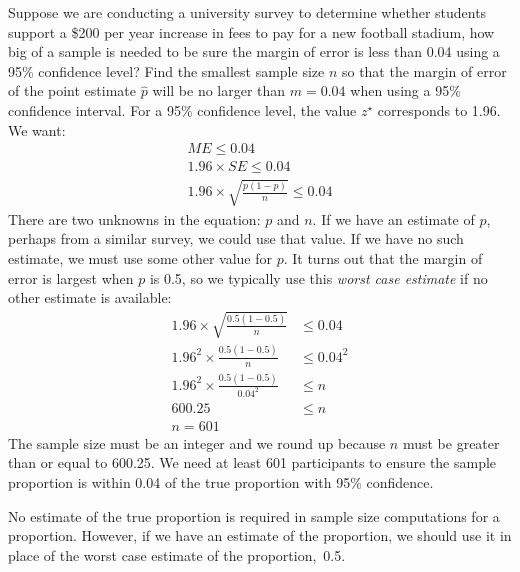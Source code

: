 \begin{example}{Suppose we are conducting a university survey to determine whether students support a \$200 per year increase in fees to pay for a new football stadium, how big of a sample is needed to be sure the margin of error is less than 0.04 using a 95\% confidence level? Find the smallest sample size $n$ so that the margin of error of the point estimate $\hat{p}$ will be no larger than $m=0.04$ when using a 95\% confidence interval.}
For a 95\% confidence level, the value $z^{\star}$ corresponds to 1.96. We want:
\begin{align*}
ME \leq 0.04 \\
1.96 \times SE \leq 0.04 \\
1.96\times \sqrt{\frac{p(1-p)}{n}} \leq 0.04
\end{align*}
There are two unknowns in the equation: $p$ and $n$. If we have an estimate of $p$, perhaps from a similar survey, we could use that value. If we have no such estimate, we must use some other value for $p$. It turns out that the margin of error is largest when $p$ is 0.5, so we typically use this \emph{worst case estimate} if no other estimate is available:
\begin{align*}
	1.96\times \sqrt{\frac{0.5(1-0.5)}{n}} &\leq 0.04 \\
	1.96^2\times \frac{0.5(1-0.5)}{n} &\leq 0.04^2 \\
	1.96^2\times \frac{0.5(1-0.5)}{0.04^2} &\leq n \\
	600.25 &\leq n \\
	n=601
\end{align*}
The sample size must be an integer and we round up because $n$ must be greater than or equal to 600.25. We need at least 601 participants to ensure the sample proportion is within 0.04 of the true proportion with 95\% confidence.
\end{example}

No estimate of the true proportion is required in sample size computations for a proportion. However, if we have an estimate of the proportion, we should use it in place of the worst case estimate of the proportion,~0.5.

